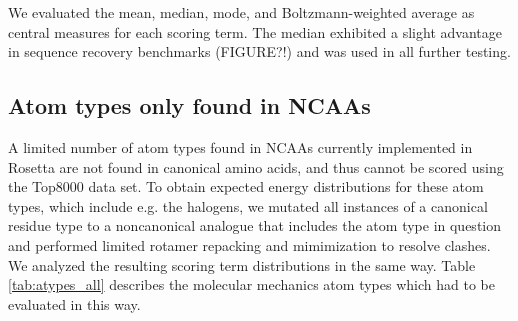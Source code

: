 We evaluated the mean, median, mode, and Boltzmann-weighted average as central measures for each scoring term.
The median exhibited a slight advantage in sequence recovery benchmarks (FIGURE?!) and was used in all further testing.

\subsection{Atom types only found in NCAAs}
A limited number of atom types found in NCAAs currently implemented in Rosetta are not found in canonical amino acids, and thus cannot be scored using the Top8000 data set.
To obtain expected energy distributions for these atom types, which include e.g. the halogens, we mutated all instances of a canonical residue type to a noncanonical analogue that includes the atom type in question and performed limited rotamer repacking and mimimization to resolve clashes.
We analyzed the resulting scoring term distributions in the same way.
Table \ref{tab:atypes_all} describes the molecular mechanics atom types which had to be evaluated in this way.


